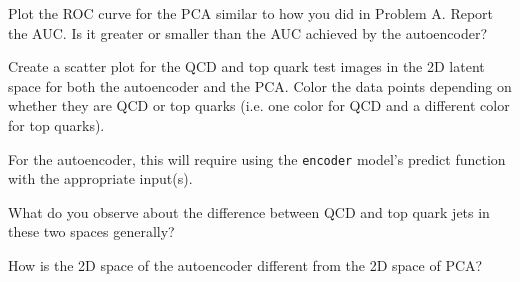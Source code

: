 \begin{problem}[15]
Plot the ROC curve for the PCA similar to how you did in Problem A.
Report the AUC.
Is it greater or smaller than the AUC achieved by the autoencoder?

\end{problem}

\begin{problem}[25]
Create a scatter plot for the QCD and top quark test images in the 2D latent space for both the autoencoder and the PCA.
Color the data points depending on whether they are QCD or top quarks (i.e. one color for QCD and a different color for top quarks).

For the autoencoder, this will require using the \texttt{encoder} model's {predict} function with the appropriate input(s).

What do you observe about the difference between QCD and top quark jets in these two spaces generally?

How is the 2D space of the autoencoder different from the 2D space of PCA?
\end{problem}


